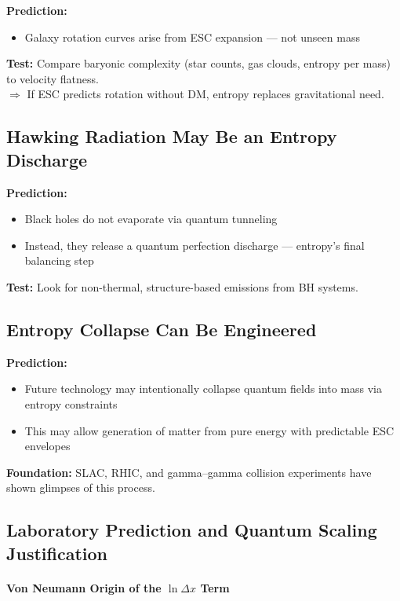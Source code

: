 \documentclass[12pt]{article}
\begin{document}
\textbf{Prediction:}
\begin{itemize}
    \item Galaxy rotation curves arise from ESC expansion — not unseen mass
\end{itemize}

\textbf{Test:} Compare baryonic complexity (star counts, gas clouds, entropy per mass) to velocity flatness.\\
$\Rightarrow$ If ESC predicts rotation without DM, entropy replaces gravitational need.

\subsection{Hawking Radiation May Be an Entropy Discharge}

\textbf{Prediction:}
\begin{itemize}
    \item Black holes do not evaporate via quantum tunneling
    \item Instead, they release a quantum perfection discharge — entropy’s final balancing step
\end{itemize}

\textbf{Test:} Look for non-thermal, structure-based emissions from BH systems.

\subsection{Entropy Collapse Can Be Engineered}

\textbf{Prediction:}
\begin{itemize}
    \item Future technology may intentionally collapse quantum fields into mass via entropy constraints
    \item This may allow generation of matter from pure energy with predictable ESC envelopes
\end{itemize}

\textbf{Foundation:} SLAC, RHIC, and gamma–gamma collision experiments have shown glimpses of this process.

\subsection{Laboratory Prediction and Quantum Scaling Justification}

\paragraph{Von Neumann Origin of the $\ln \Delta x$ Term}
\end{document}
